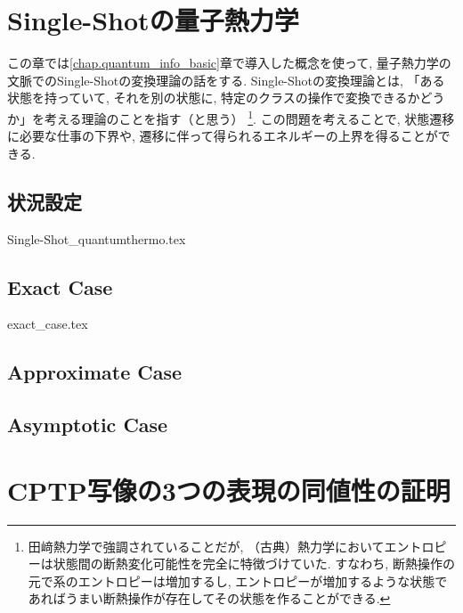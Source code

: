 \documentclass[report]{jlreq}
\begin{document}

\chapter{Single-Shotの量子熱力学}
この章では\ref{chap.quantum_info_basic}章で導入した概念を使って, 量子熱力学の文脈でのSingle-Shotの変換理論の話をする. 
Single-Shotの変換理論とは, 「ある状態を持っていて, それを別の状態に, 特定のクラスの操作で変換できるかどうか」を考える理論のことを指す（と思う）
\footnote{田﨑熱力学で強調されていることだが, （古典）熱力学においてエントロピーは状態間の断熱変化可能性を完全に特徴づけていた. 
すなわち, 断熱操作の元で系のエントロピーは増加するし, エントロピーが増加するような状態であればうまい断熱操作が存在してその状態を作ることができる. }. 
この問題を考えることで, 状態遷移に必要な仕事の下界や, 遷移に伴って得られるエネルギーの上界を得ることができる. 

\section{状況設定}\label{sec.Single-Shot_quantumthermo}
{Single-Shot_quantumthermo.tex}
\section{Exact Case}
{exact_case.tex}
\section{Approximate Case}
\section{Asymptotic Case}

\appendix
\chapter{CPTP写像の3つの表現の同値性の証明}
  
\end{document}
